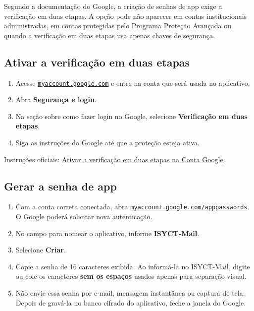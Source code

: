 \documentclass[11pt,a4paper]{article}
\newcommand{\menu}[1]{\textbf{#1}}
\begin{document}
Segundo a documentação do Google, a criação de senhas de app exige a verificação em duas etapas. A opção pode não aparecer em contas institucionais administradas, em contas protegidas pelo Programa Proteção Avançada ou quando a verificação em duas etapas usa apenas chaves de segurança.

\subsection{Ativar a verificação em duas etapas}

\begin{enumerate}
  \item Acesse \href{https://myaccount.google.com/}{\texttt{myaccount.google.com}} e entre na conta que será usada no aplicativo.
  \item Abra \menu{Segurança e login}.
  \item Na seção sobre como fazer login no Google, selecione \menu{Verificação em duas etapas}.
  \item Siga as instruções do Google até que a proteção esteja ativa.
\end{enumerate}

Instruções oficiais: \href{https://support.google.com/accounts/answer/185839?hl=pt-BR}{Ativar a verificação em duas etapas na Conta Google}.

\subsection{Gerar a senha de app}
\label{sec:senha-app-pratica}

\begin{enumerate}
  \item Com a conta correta conectada, abra \href{https://myaccount.google.com/apppasswords}{\texttt{myaccount.google.com/apppasswords}}. O Google poderá solicitar nova autenticação.
  \item No campo para nomear o aplicativo, informe \textbf{ISYCT-Mail}.
  \item Selecione \menu{Criar}.
  \item Copie a senha de 16 caracteres exibida. Ao informá-la no ISYCT-Mail, digite ou cole os caracteres \textbf{sem os espaços} usados apenas para separação visual.
  \item Não envie essa senha por e-mail, mensagem instantânea ou captura de tela. Depois de gravá-la no banco cifrado do aplicativo, feche a janela do Google.
\end{enumerate}
\end{document}
